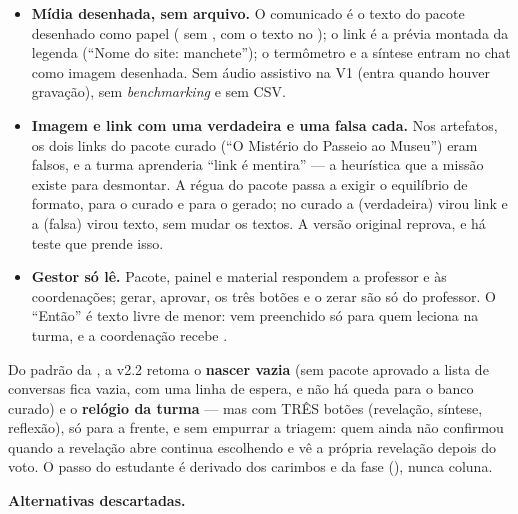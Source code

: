 \begin{itemize}
    missões com equipe do módulo , e o painel e o Termômetro
    contam por computador --- o mapa das equipes lido dentro do
    , e as linhas colapsadas em unidades, como no UnooTube e no
    unooGPT.
  \item \textbf{Mídia desenhada, sem arquivo.} O comunicado é o texto do pacote
    desenhado como papel ( sem , com o texto no
    ); o link é a prévia montada da legenda (\enquote{Nome do site:
    manchete}); o termômetro e a síntese entram no chat como imagem desenhada.
    Sem áudio assistivo na V1 (entra quando houver gravação), sem
    \emph{benchmarking} e sem CSV.
  \item \textbf{Imagem e link com uma verdadeira e uma falsa cada.} Nos
    artefatos, os dois links do pacote curado (\enquote{O Mistério do Passeio
    ao Museu}) eram falsos, e a turma aprenderia \enquote{link é mentira} --- a
    heurística que a missão existe para desmontar. A régua do pacote passa a
    exigir o equilíbrio de formato, para o curado e para o gerado; no curado a
     (verdadeira) virou link e a  (falsa) virou texto,
    sem mudar os textos. A versão original reprova, e há teste que prende isso.
  \item \textbf{Gestor só lê.} Pacote, painel e material respondem a professor e
    às coordenações; gerar, aprovar, os três botões e o zerar são só do
    professor. O \enquote{Então} é texto livre de menor: vem preenchido só para
    quem leciona na turma, e a coordenação recebe .
\end{itemize}

Do padrão da , a v2.2 retoma o \textbf{nascer vazia} (sem pacote
aprovado a lista de conversas fica vazia, com uma linha de espera, e não há
queda para o banco curado) e o \textbf{relógio da turma} --- mas com TRÊS botões
(revelação, síntese, reflexão), só para a frente, e sem empurrar a triagem:
quem ainda não confirmou quando a revelação abre continua escolhendo e vê a
própria revelação depois do voto. O passo do estudante é derivado dos
carimbos e da fase (), nunca coluna.

\textbf{Alternativas descartadas.}

